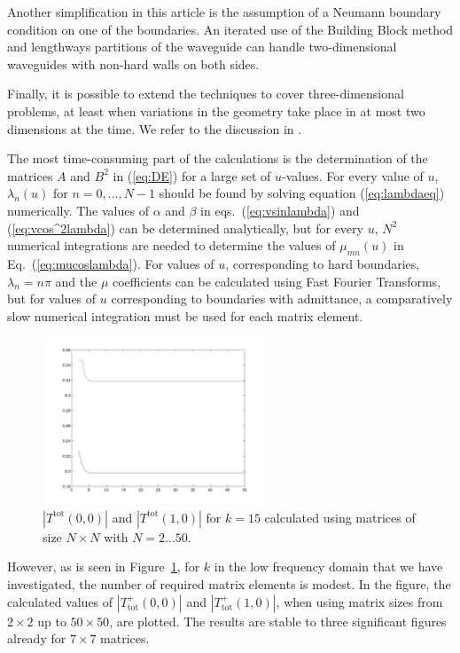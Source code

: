 \documentclass[numreferences]{kluwer}
\providecommand{\abs}[1]{\left\lvert#1\right\rvert}
\newcommand{\Ttot}{T^+_{\text{tot}}}
\begin{document}
Another simplification in this article is the assumption of a Neumann
boundary condition on one of the boundaries. An iterated use of the
Building Block method and lengthways partitions of the waveguide can
handle two-dimensional waveguides with non-hard walls on both sides.

Finally, it is possible to extend the techniques to cover
three-dimensional problems, at least when variations in the geometry
take place in at most two dimensions at the time. We refer to the
discussion in \cite{Nilsson:2002}.

The most time-consuming part of the calculations is the determination
of the matrices $A$ and $B^2$ in (\ref{eq:DE}) for a large set of
$u$-values. For every value of $u$, $\lambda_n(u)$ for $n=0,\dots,N-1$
should be found by solving equation (\ref{eq:lambdaeq}) numerically.
The values of $\alpha$ and $\beta$ in eqs.~(\ref{eq:vsinlambda}) and
(\ref{eq:vcos^2lambda}) can be determined analytically, but for every
$u$, $N^2$ numerical integrations are needed to determine the values
of $\mu_{mn}(u)$ in Eq.~(\ref{eq:mucoslambda}). For values of $u$,
corresponding to hard boundaries, $\lambda_n=n\pi$ and the $\mu$
coefficients can be calculated using Fast Fourier Transforms, but for
values of $u$ corresponding to boundaries with admittance, a
comparatively slow numerical integration must be used for each matrix
element.

\begin{figure}[htb]
  \centering
  \includegraphics[keepaspectratio=false,width=0.7\linewidth,height=5cm]{T_N}
  \caption{$\abs{T^{\text{tot}}(0,0)}$ and $\abs{T^{\text{tot}}(1,0)}$
    for $k=15$ calculated using matrices of size $N\times N$ with
    $N=2\dots50$.}
  \label{fig:T_N}
\end{figure}

However, as is seen in Figure~\ref{fig:T_N}, for $k$ in the low
frequency domain that we have investigated, the number of required
matrix elements is modest.  In the figure, the calculated values of
$\abs{\Ttot(0,0)}$ and $\abs{\Ttot(1,0)}$, when using matrix sizes
from $2\times2$ up to $50\times50$, are plotted. The results are
stable to three significant figures already for $7\times7$ matrices.
\end{document}
